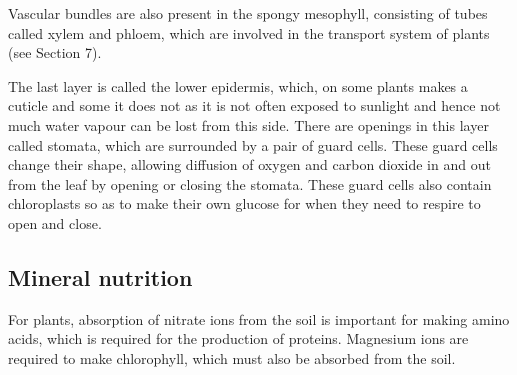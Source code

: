 Vascular bundles are also present in the spongy mesophyll, consisting of tubes called xylem and 
phloem, which are involved in the transport system of plants (see Section 7).

The last layer is called the lower epidermis, which, on some plants makes a cuticle and some it
does not as it is not often exposed to sunlight and hence not much water vapour can be lost from
this side. There are openings in this layer called stomata, which are surrounded by a pair of
guard cells. These guard cells change their shape, allowing diffusion of oxygen and carbon dioxide
in and out from the leaf by opening or closing the stomata. These guard cells also contain 
chloroplasts so as to make their own glucose for when they need to respire to open and close.

\subsection{Mineral nutrition}

For plants, absorption of nitrate ions from the soil is important for making amino acids, which is
required for the production of proteins. Magnesium ions are required to make chlorophyll, which
must also be absorbed from the soil.
